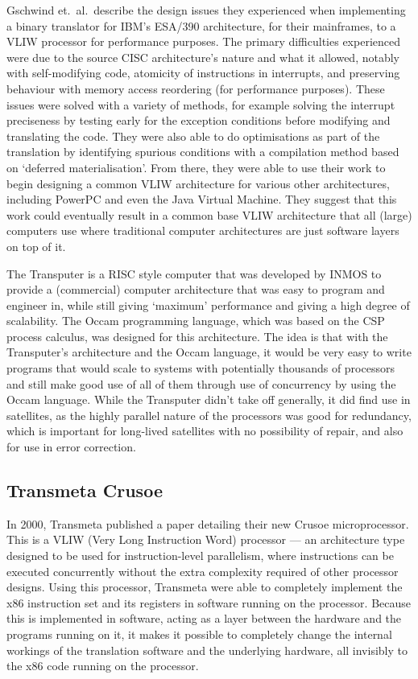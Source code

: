 Gschwind et.\ al.\ describe the design issues they experienced when implementing
a binary translator for IBM's ESA/390 architecture, for their mainframes, to a
VLIW processor for performance purposes. The primary difficulties experienced
were due to the source CISC architecture's nature and what it allowed, notably
with self-modifying code, atomicity of instructions in interrupts, and
preserving behaviour with memory access reordering (for performance purposes).
These issues were solved with a variety of methods, for example solving the
interrupt preciseness by testing early for the exception conditions before
modifying and translating the code. They were also able to do optimisations as
part of the translation by identifying spurious conditions with a compilation
method based on `deferred materialisation'. From there, they were able to use
their work to begin designing a common VLIW architecture for various other
architectures, including PowerPC and even the Java Virtual Machine. They suggest
that this work could eventually result in a common base VLIW architecture that
all (large) computers use where traditional computer architectures are just
software layers on top of it.\cite{Gschwind2000BinaryTranslation}

The Transputer is a RISC style computer that was developed by INMOS to provide a
(commercial) computer architecture that was easy to program and engineer in,
while still giving `maximum' performance and giving a high degree of
scalability. The Occam programming language, which was based on the CSP process
calculus, was designed for this architecture.  The idea is that with the
Transputer's architecture and the Occam language, it would be very easy to write
programs that would scale to systems with potentially thousands of processors
and still make good use of all of them through use of concurrency by using the
Occam language.\cite{Whitby1985Transputer} While the Transputer didn't take off
generally, it did find use in satellites, as the highly parallel nature of the
processors was good for redundancy, which is important for long-lived satellites
with no possibility of repair, and also for use in error
correction.\cite{Mattos1990Transputer}

\subsection{Transmeta Crusoe}
In 2000, Transmeta published a paper detailing their new Crusoe microprocessor.
This is a VLIW (Very Long Instruction Word) processor --- an architecture type
designed to be used for instruction-level parallelism, where instructions can be
executed concurrently without the extra complexity required of other processor
designs. Using this processor, Transmeta were able to completely implement the
x86 instruction set and its registers in software running on the processor.
Because this is implemented in software, acting as a layer between the hardware
and the programs running on it, it makes it possible to completely change the
internal workings of the translation software and the underlying hardware, all
invisibly to the x86 code running on the processor.

